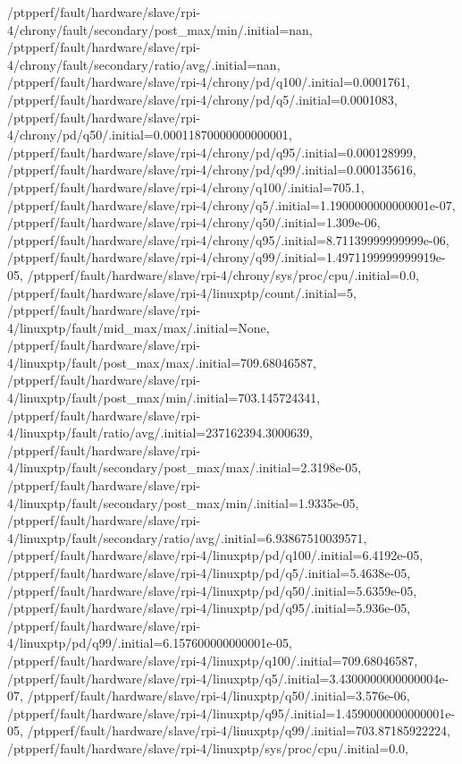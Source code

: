{    /ptpperf/fault/hardware/slave/rpi-4/chrony/fault/secondary/post_max/min/.initial=nan,
    /ptpperf/fault/hardware/slave/rpi-4/chrony/fault/secondary/ratio/avg/.initial=nan,
    /ptpperf/fault/hardware/slave/rpi-4/chrony/pd/q100/.initial=0.0001761,
    /ptpperf/fault/hardware/slave/rpi-4/chrony/pd/q5/.initial=0.0001083,
    /ptpperf/fault/hardware/slave/rpi-4/chrony/pd/q50/.initial=0.00011870000000000001,
    /ptpperf/fault/hardware/slave/rpi-4/chrony/pd/q95/.initial=0.000128999,
    /ptpperf/fault/hardware/slave/rpi-4/chrony/pd/q99/.initial=0.000135616,
    /ptpperf/fault/hardware/slave/rpi-4/chrony/q100/.initial=705.1,
    /ptpperf/fault/hardware/slave/rpi-4/chrony/q5/.initial=1.1900000000000001e-07,
    /ptpperf/fault/hardware/slave/rpi-4/chrony/q50/.initial=1.309e-06,
    /ptpperf/fault/hardware/slave/rpi-4/chrony/q95/.initial=8.71139999999999e-06,
    /ptpperf/fault/hardware/slave/rpi-4/chrony/q99/.initial=1.4971199999999919e-05,
    /ptpperf/fault/hardware/slave/rpi-4/chrony/sys/proc/cpu/.initial=0.0,
    /ptpperf/fault/hardware/slave/rpi-4/linuxptp/count/.initial=5,
    /ptpperf/fault/hardware/slave/rpi-4/linuxptp/fault/mid_max/max/.initial=None,
    /ptpperf/fault/hardware/slave/rpi-4/linuxptp/fault/post_max/max/.initial=709.68046587,
    /ptpperf/fault/hardware/slave/rpi-4/linuxptp/fault/post_max/min/.initial=703.145724341,
    /ptpperf/fault/hardware/slave/rpi-4/linuxptp/fault/ratio/avg/.initial=237162394.3000639,
    /ptpperf/fault/hardware/slave/rpi-4/linuxptp/fault/secondary/post_max/max/.initial=2.3198e-05,
    /ptpperf/fault/hardware/slave/rpi-4/linuxptp/fault/secondary/post_max/min/.initial=1.9335e-05,
    /ptpperf/fault/hardware/slave/rpi-4/linuxptp/fault/secondary/ratio/avg/.initial=6.93867510039571,
    /ptpperf/fault/hardware/slave/rpi-4/linuxptp/pd/q100/.initial=6.4192e-05,
    /ptpperf/fault/hardware/slave/rpi-4/linuxptp/pd/q5/.initial=5.4638e-05,
    /ptpperf/fault/hardware/slave/rpi-4/linuxptp/pd/q50/.initial=5.6359e-05,
    /ptpperf/fault/hardware/slave/rpi-4/linuxptp/pd/q95/.initial=5.936e-05,
    /ptpperf/fault/hardware/slave/rpi-4/linuxptp/pd/q99/.initial=6.157600000000001e-05,
    /ptpperf/fault/hardware/slave/rpi-4/linuxptp/q100/.initial=709.68046587,
    /ptpperf/fault/hardware/slave/rpi-4/linuxptp/q5/.initial=3.4300000000000004e-07,
    /ptpperf/fault/hardware/slave/rpi-4/linuxptp/q50/.initial=3.576e-06,
    /ptpperf/fault/hardware/slave/rpi-4/linuxptp/q95/.initial=1.4590000000000001e-05,
    /ptpperf/fault/hardware/slave/rpi-4/linuxptp/q99/.initial=703.87185922224,
    /ptpperf/fault/hardware/slave/rpi-4/linuxptp/sys/proc/cpu/.initial=0.0,
}
